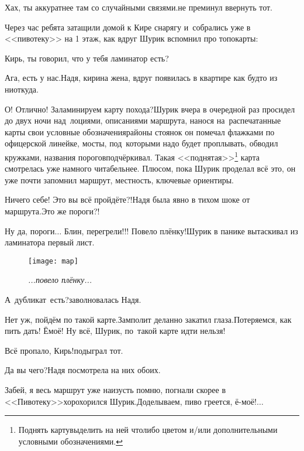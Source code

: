 \diagdash Хах, ты аккуратнее там со случайными связями.\mdash не преминул ввернуть тот. %

Через час ребята затащили домой к Кире снарягу и~собрались уже в <<пивотеку>> на 1 этаж, как вдруг Шурик вспомнил про топокарты:

\diagdash Кирь, ты говорил, что у тебя ламинатор есть?

\diagdash Ага, есть у нас.\mdash Надя, кирина жена, вдруг появилась в квартире как будто из ниоткуда.

\renewcommand*{\thefootnote}{\fnsymbol{footnote}}
\diagdash О! Отлично! Заламинируем карту похода?\mdash Шурик вчера в очередной раз просидел до двух ночи над~лоциями, описаниями маршрута, нанося на~распечатанные карты свои условные обозначения\mdash районы стоянок он помечал флажками по офицерской линейке, мосты, под~которыми надо будет проплывать, обводил кружками, названия порогов\mdash подчёркивал. Такая <<поднятая>>\footnote[1]{Поднять карту\mdash выделить на ней что\sdash либо цветом и/или дополнительными условными обозначениями.} карта смотрелась уже намного читабельнее. Плюсом, пока Шурик проделал всё это, он уже почти запомнил маршрут, местность, ключевые ориентиры.

\diagdash Ничего себе! Это вы всё пройдёте?!\mdash Надя была явно в тихом шоке от маршрута.\mdash Это же пороги?!

\diagdash Ну да, пороги$\ldots$ Блин, перегрели!!! Повело плёнку!\mdash Шурик в панике вытаскивал из ламинатора первый лист.\begin{wrapfigure}[11]{l}{0.49\textwidth}
	\centering
	\texttt{[image: map]}
	\caption{\small\textit{...повело плёнку...}}
\end{wrapfigure}

\diagdash А~дубликат~есть?\mdash заволновалась Надя.

\diagdash Нет уж, пойдём по такой карте.\mdash Замполит деланно закатил глаза.\mdash Потеряемся, как пить дать! Ё\sdash моё! Ну всё, Шурик, по~такой карте идти нельзя! 

\diagdash Всё пропало, Кирь!\mdash подыграл тот.


\diagdash Да вы чего?\mdash Надя посмотрела на них обоих.

\diagdash Забей, я весь маршрут уже наизусть помню, погнали скорее в <<Пивотеку>>\mdash хорохорился Шурик.\mdash Доделываем, пиво греется, ё-моё!$\ldots$

